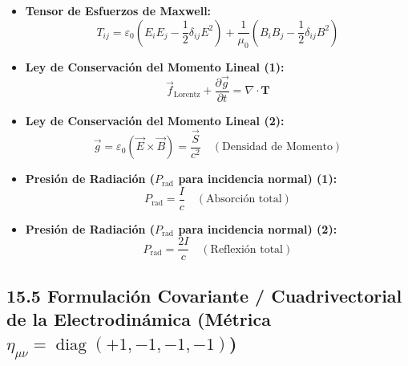\documentclass[11pt,a4paper]{article}
\begin{document}
\begin{itemize}
  \item \textbf{Tensor de Esfuerzos de Maxwell:}
  \[
    T_{ij} = \varepsilon_0 \left( E_i E_j - \frac{1}{2} \delta_{ij} E^2 \right) + \frac{1}{\mu_0} \left( B_i B_j - \frac{1}{2} \delta_{ij} B^2 \right)
  \]
  \item \textbf{Ley de Conservación del Momento Lineal (1):}
  \[
    \vec{f}_{\text{Lorentz}} + \frac{\partial \vec{g}}{\partial t} = \nabla \cdot \mathbf{T}
  \]
  \item \textbf{Ley de Conservación del Momento Lineal (2):}
  \[
    \vec{g} = \varepsilon_0 (\vec{E} \times \vec{B}) = \frac{\vec{S}}{c^2} \quad (\text{Densidad de Momento})
  \]
  \item \textbf{Presión de Radiación ($P_{\mathrm{rad}}$ para incidencia normal) (1):}
  \[
    P_{\mathrm{rad}} = \frac{I}{c} \quad (\text{Absorción total})
  \]
  \item \textbf{Presión de Radiación ($P_{\mathrm{rad}}$ para incidencia normal) (2):}
  \[
    P_{\mathrm{rad}} = \frac{2I}{c} \quad (\text{Reflexión total})
  \]
\end{itemize}

\subsection*{15.5 Formulación Covariante / Cuadrivectorial de la Electrodinámica (Métrica $\eta_{\mu\nu} = \operatorname{diag}(+1, -1, -1, -1)$)}
\end{document}
